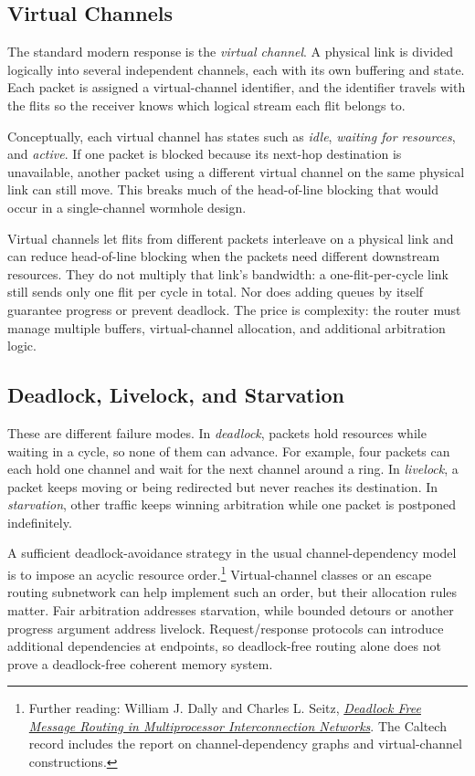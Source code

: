 \subsection{Virtual Channels}\label{subsec:pin-virtual-channels}
The standard modern response is the \textit{virtual channel}.
A physical link is divided logically into several independent channels, each with its own buffering and state.
Each packet is assigned a virtual-channel identifier, and the identifier travels with the flits so the receiver knows which logical stream each flit belongs to.

Conceptually, each virtual channel has states such as \textit{idle}, \textit{waiting for resources}, and \textit{active}.
If one packet is blocked because its next-hop destination is unavailable, another packet using a different virtual channel on the same physical link can still move.
This breaks much of the head-of-line blocking that would occur in a single-channel wormhole design.

Virtual channels let flits from different packets interleave on a physical link and can reduce head-of-line blocking when the packets need different downstream resources.
They do not multiply that link's bandwidth: a one-flit-per-cycle link still sends only one flit per cycle in total.
Nor does adding queues by itself guarantee progress or prevent deadlock.
The price is complexity: the router must manage multiple buffers, virtual-channel allocation, and additional arbitration logic.

\subsection{Deadlock, Livelock, and Starvation}\label{subsec:network-progress}
These are different failure modes.
In \textit{deadlock}, packets hold resources while waiting in a cycle, so none of them can advance.
For example, four packets can each hold one channel and wait for the next channel around a ring.
In \textit{livelock}, a packet keeps moving or being redirected but never reaches its destination.
In \textit{starvation}, other traffic keeps winning arbitration while one packet is postponed indefinitely.

A sufficient deadlock-avoidance strategy in the usual channel-dependency model is to impose an acyclic resource order.\footnote{Further reading: William J. Dally and Charles L. Seitz, \href{https://authors.library.caltech.edu/records/vqrey-g1h07}{\emph{Deadlock Free Message Routing in Multiprocessor Interconnection Networks}}. The Caltech record includes the report on channel-dependency graphs and virtual-channel constructions.}
Virtual-channel classes or an escape routing subnetwork can help implement such an order, but their allocation rules matter.
Fair arbitration addresses starvation, while bounded detours or another progress argument address livelock.
Request/response protocols can introduce additional dependencies at endpoints, so deadlock-free routing alone does not prove a deadlock-free coherent memory system.


